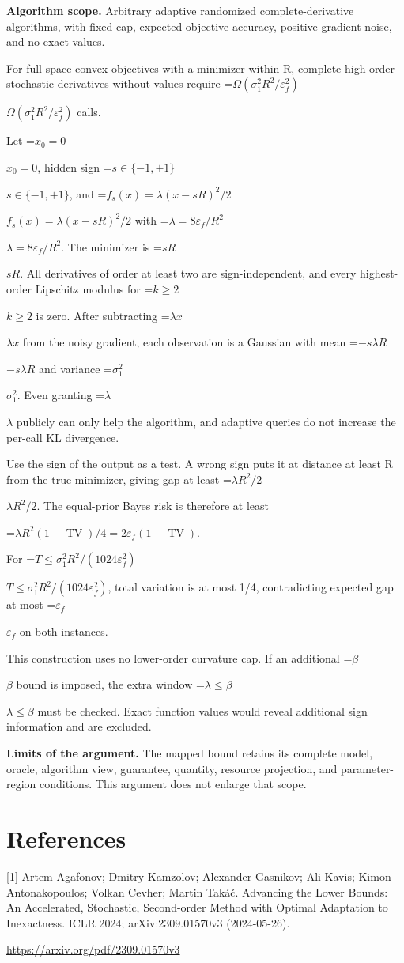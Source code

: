 \documentclass[10pt,a4paper]{article}
\newcommand{\AtlasMath}[1]{\par\begingroup\centering\setbox0=\hbox{$\displaystyle #1$}\ifdim\wd0>1.4\linewidth\typeout{ATLAS WIDE FORMULA: \the\wd0}\fi\ifdim\wd0>\linewidth\resizebox{\linewidth}{!}{\box0}\else\box0\fi\par\endgroup}
\newcommand{\AtlasInlineMath}[1]{\begingroup\setbox0=\hbox{$#1$}\ifdim\wd0>.4\linewidth\endgroup\AtlasMath{#1}\else\endgroup$#1$\fi}
\begin{document}
\textbf{Algorithm scope.} Arbitrary adaptive randomized complete-derivative algorithms, with fixed cap, expected objective accuracy, positive gradient noise, and no exact values.

For full-space convex objectives with a minimizer within R, complete high-order stochastic derivatives without values require \AtlasInlineMath{\Omega(\sigma_1^2R^2/\varepsilon_f^2)} calls.

Let \AtlasInlineMath{x_0=0}, hidden sign \AtlasInlineMath{s\in\{-1,+1\}}, and \AtlasInlineMath{f_s(x)=\lambda(x-sR)^2/2} with \AtlasInlineMath{\lambda=8\varepsilon_f/R^2}. The minimizer is \AtlasInlineMath{sR}. All derivatives of order at least two are sign-independent, and every highest-order Lipschitz modulus for \AtlasInlineMath{k\ge2} is zero. After subtracting \AtlasInlineMath{\lambda x} from the noisy gradient, each observation is a Gaussian with mean \AtlasInlineMath{-s\lambda R} and variance \AtlasInlineMath{\sigma_1^2}. Even granting \AtlasInlineMath{\lambda} publicly can only help the algorithm, and adaptive queries do not increase the per-call KL divergence.

Use the sign of the output as a test. A wrong sign puts it at distance at least R from the true minimizer, giving gap at least \AtlasInlineMath{\lambda R^2/2}. The equal-prior Bayes risk is therefore at least

\AtlasMath{\lambda R^2(1-\operatorname{TV})/4=2\varepsilon_f(1-\operatorname{TV}).}

For \AtlasInlineMath{T\le\sigma_1^2R^2/(1024\varepsilon_f^2)}, total variation is at most 1/4, contradicting expected gap at most \AtlasInlineMath{\varepsilon_f} on both instances.

This construction uses no lower-order curvature cap. If an additional \AtlasInlineMath{\beta} bound is imposed, the extra window \AtlasInlineMath{\lambda\le\beta} must be checked. Exact function values would reveal additional sign information and are excluded.

\textbf{Limits of the argument.} The mapped bound retains its complete model, oracle, algorithm view, guarantee, quantity, resource projection, and parameter-region conditions. This argument does not enlarge that scope.

\section{References}
[1] Artem Agafonov; Dmitry Kamzolov; Alexander Gasnikov; Ali Kavis; Kimon Antonakopoulos; Volkan Cevher; Martin Takáč. Advancing the Lower Bounds: An Accelerated, Stochastic, Second-order Method with Optimal Adaptation to Inexactness. ICLR 2024; arXiv:2309.01570v3 (2024-05-26).

\url{https://arxiv.org/pdf/2309.01570v3}
\end{document}
